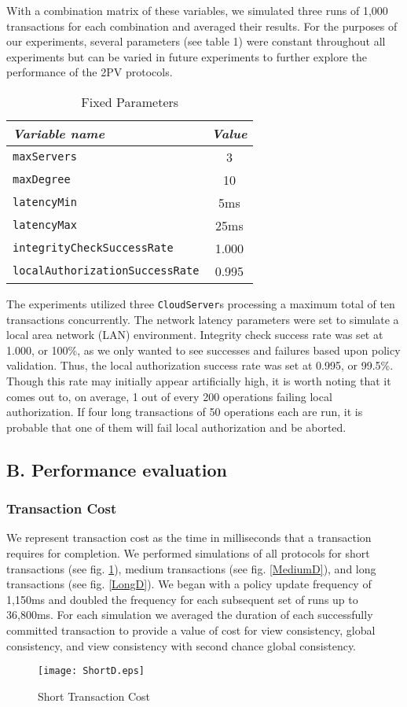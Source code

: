 \documentclass[11pt]{article}
\begin{document}
With a combination matrix of these variables, we simulated three runs of 1,000 transactions for each combination and averaged their results. For the purposes of our experiments, several parameters (see table 1) were constant throughout all experiments but can be varied in future experiments to further explore the performance of the 2PV protocols.
\begin{table}[htdp]
\begin{center}\begin{tabular}{|l|c|}\hline \emph{Variable name} & \emph{Value} \\\hline \texttt{maxServers} & 3 \\\hline \texttt{maxDegree} & 10 \\\hline \texttt{latencyMin} & 5ms \\\hline \texttt{latencyMax} & 25ms \\\hline \texttt{integrityCheckSuccessRate} & 1.000 \\\hline \texttt{localAuthorizationSuccessRate} & 0.995 \\\hline \end{tabular} \caption{Fixed Parameters}
\end{center}
\label{Fixed}
\end{table}
The experiments utilized three \texttt{CloudServer}s processing a maximum total of ten transactions concurrently. The network latency parameters were set to simulate a local area network (LAN) environment. Integrity check success rate was set at 1.000, or 100\%, as we only wanted to see successes and failures based upon policy validation. Thus, the local authorization success rate was set at 0.995, or 99.5\%. Though this rate may initially appear artificially high, it is worth noting that it comes out to, on average, 1 out of every 200 operations failing local authorization. If four long transactions of 50 operations each are run, it is probable that one of them will fail local authorization and be aborted.
\subsection{B. Performance evaluation}
\subsubsection{Transaction Cost}
We represent transaction cost as the time in milliseconds that a transaction requires for completion. We performed simulations of all protocols for short transactions (see fig. \ref{ShortD}), medium transactions (see fig. \ref{MediumD}), and long transactions (see fig. \ref{LongD}). We began with a policy update frequency of 1,150ms and doubled the frequency for each subsequent set of runs up to 36,800ms. For each simulation we averaged the duration of each successfully committed transaction to provide a value of cost for view consistency, global consistency, and view consistency with second chance global consistency.
\begin{figure}[h]
\begin{center}
\texttt{[image: ShortD.eps]}
\caption{Short Transaction Cost}
\label{ShortD}
\end{center}
\end{figure}
\end{document}
